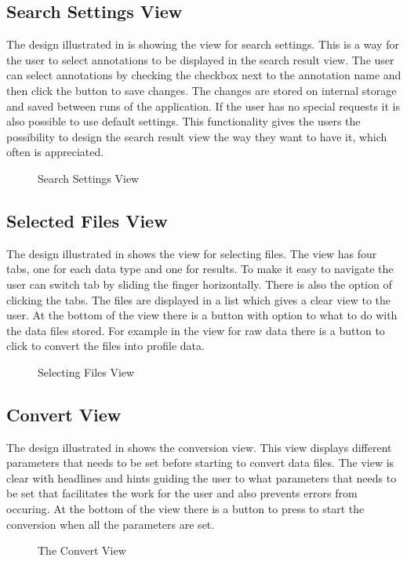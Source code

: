 \subsection{Search Settings View}
The design illustrated in  is showing the view for search settings. 
This is a way for the user to select annotations to be displayed in the search result view.
The user can select annotations by checking the checkbox next to the annotation name and then click the button to save changes.
The changes are stored on internal storage and saved between runs of the application.
If the user has no special requests it is also possible to use default settings. 
This functionality gives the users the possibility to design the search result view the way they want to have it, which often is appreciated. 

\begin{figure}[ht]
\caption{Search Settings View}
\label{fig:and_search_settings}
\end{figure}
\FloatBarrier

\subsection{Selected Files View}
The design illustrated in  shows the view for selecting files.
The view has four tabs, one for each data type and one for results. 
To make it easy to navigate the user can switch tab by sliding the finger horizontally. 
There is also the option of clicking the tabs. 
The files are displayed in a list which gives a clear view to the user.
At the bottom of the view there is a button with option to what to do with the data files stored.
For example in the view for raw data there is a button to click to convert the files into profile data.

\begin{figure}[h]
\caption{Selecting Files View}
\label{fig:and_selected}
\end{figure}
\FloatBarrier

\subsection{Convert View}
The design illustrated in  shows the conversion view. 
This view displays different parameters that needs to be set before starting to convert data files. 
The view is clear with headlines and hints guiding the user to what parameters that needs to be set that facilitates the work for the user and also prevents errors from occuring. 
At the bottom of the view there is a button to press to start the conversion when all the parameters are set. 

\begin{figure}[h]
\caption{The Convert View}
\label{fig:and_convert_man} 
\end{figure}
\FloatBarrier
